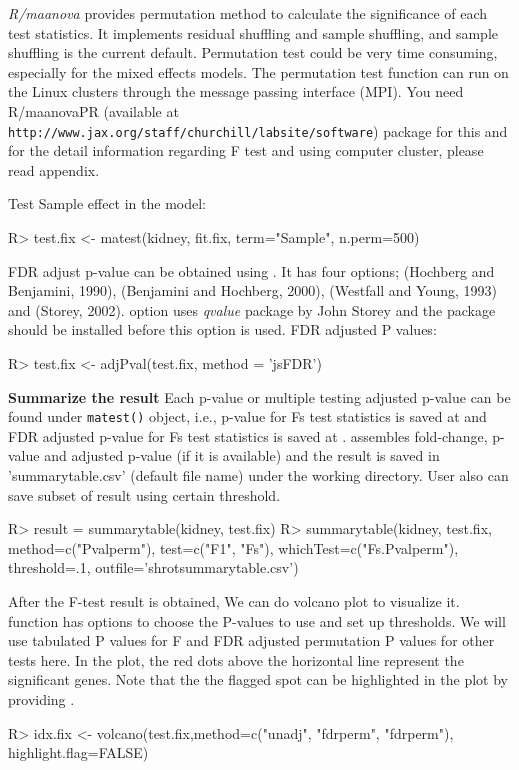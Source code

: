 {\em R/maanova} provides permutation method to calculate the significance of
each test statistics. It implements residual shuffling and sample shuffling,
and sample shuffling is the current default. Permutation test could be very
time consuming, especially for the mixed effects models. The permutation
test function can run on the Linux clusters through the message passing 
interface (MPI). You need R/maanovaPR (available at {\tt
http://www.jax.org/staff/churchill/labsite/software}) package for this and for the detail information regarding F test and 
using computer cluster, please read appendix. 

Test Sample effect in the model:
\begin{Sinput}
R> test.fix <- matest(kidney, fit.fix, term="Sample", n.perm=500)
\end{Sinput}

FDR adjust p-value can be obtained using . It has four
  options;   (Hochberg and Benjamini, 1990),  (Benjamini and Hochberg, 2000), 
  (Westfall and Young, 1993) and  (Storey,
  2002).  option uses {\em qvalue} package by John
  Storey and the package should be installed before this option
  is used. FDR adjusted P values:
\begin{Sinput}
R> test.fix <- adjPval(test.fix, method = 'jsFDR')
\end{Sinput}
{\bf Summarize the result} Each p-value or multiple testing adjusted p-value
can be found under {\tt matest()} object, i.e., p-value for Fs test statistics is
saved at  and FDR adjusted p-value for Fs
test statistics is saved at .  assembles
fold-change, p-value and adjusted p-value (if it is available) and the result
is saved in 'summarytable.csv' (default file name) under the working directory. User also can save subset of result using certain threshold.  
\begin{Sinput}
R> result = summarytable(kidney, test.fix)
R> summarytable(kidney, test.fix, method=c("Pvalperm"), test=c("F1", "Fs"),
whichTest=c("Fs.Pvalperm"), threshold=.1, outfile='shrotsummarytable.csv')
\end{Sinput}

After the F-test result is obtained, We can do volcano plot
to visualize it.  function has options to 
choose the P-values to use and set up thresholds. We will
use tabulated P values for F and FDR adjusted permutation 
P values for other tests here. 
In the plot, the red dots above the horizontal line represent
the significant genes. 
Note that the the flagged spot can be highlighted in the plot by providing .
\begin{Sinput}
R> idx.fix <- volcano(test.fix,method=c("unadj", "fdrperm", "fdrperm"),
         highlight.flag=FALSE)
\end{Sinput}

